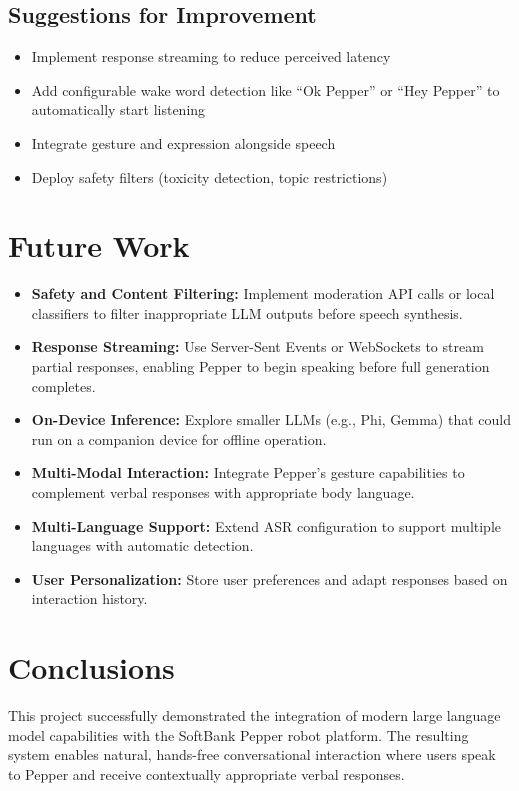 \documentclass[a4paper]{article}
\begin{document}
\subsection{Suggestions for Improvement}

\begin{itemize}[noitemsep]
    \item Implement response streaming to reduce perceived latency
    \item Add configurable wake word detection like ``Ok Pepper'' or ``Hey Pepper'' to automatically start listening
    \item Integrate gesture and expression alongside speech
    \item Deploy safety filters (toxicity detection, topic restrictions)
\end{itemize}

\section{Future Work}

\begin{itemize}
    \item \textbf{Safety and Content Filtering:} Implement moderation API calls or local classifiers to filter inappropriate LLM outputs before speech synthesis.
    \item \textbf{Response Streaming:} Use Server-Sent Events or WebSockets to stream partial responses, enabling Pepper to begin speaking before full generation completes.
    \item \textbf{On-Device Inference:} Explore smaller LLMs (e.g., Phi, Gemma) that could run on a companion device for offline operation.
    \item \textbf{Multi-Modal Interaction:} Integrate Pepper's gesture capabilities to complement verbal responses with appropriate body language.
    \item \textbf{Multi-Language Support:} Extend ASR configuration to support multiple languages with automatic detection.
    \item \textbf{User Personalization:} Store user preferences and adapt responses based on interaction history.
\end{itemize}

\section{Conclusions}

This project successfully demonstrated the integration of modern large language model capabilities with the SoftBank Pepper robot platform. The resulting system enables natural, hands-free conversational interaction where users speak to Pepper and receive contextually appropriate verbal responses.
\end{document}
